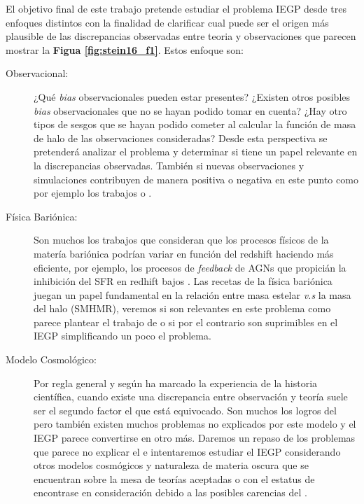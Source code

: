 El objetivo final de este trabajo pretende estudiar el problema IEGP desde tres enfoques distintos con la finalidad de clarificar cual puede ser el origen más plausible de las discrepancias observadas entre teoria y observaciones que parecen mostrar la \textbf{Figua \ref{fig:stein16_f1}}. Estos enfoque son:
\begin{description}
	\item[Observacional:] ¿Qué \textit{bias} observacionales pueden estar presentes? ¿Existen otros posibles \textit{bias} observacionales que no se hayan podido tomar en cuenta? ¿Hay otro tipos de sesgos que se hayan podido cometer al calcular la función de masa de halo de las observaciones consideradas? Desde esta perspectiva se pretenderá analizar el problema y determinar si tiene un papel relevante en la discrepancias observadas. También si nuevas observaciones y simulaciones contribuyen de manera positiva o negativa en este punto como por ejemplo los trabajos \cite{wang2019dominant} o \cite{behroozi2019universemachine}.
	
	\item[Física Bariónica:] Son muchos los trabajos que consideran que los procesos físicos de la matería bariónica podrían variar en función del redshift haciendo más eficiente, por ejemplo, los procesos de \textit{feedback} de AGNs que propicián la inhibición del SFR en redhift bajos \citep{finkelstein2015increasing}. Las recetas de la física bariónica juegan un papel fundamental en la relación entre masa estelar \textit{v.s} la masa del halo (SMHMR), veremos si son relevantes en este problema como parece plantear el trabajo de \cite{finkelstein2015increasing} o si por el contrario son suprimibles en el IEGP simplificando un poco el problema.
	
	\item[Modelo Cosmológico:] Por regla general y según ha marcado la experiencia de la historia científica, cuando existe una discrepancia entre observación y teoría suele ser el segundo factor el que está equivocado. Son muchos los logros del \lcdm pero también existen muchos problemas no explicados por este modelo y el IEGP parece convertirse en otro más. Daremos un repaso de los problemas que parece no explicar el \lcdm e intentaremos estudiar el IEGP considerando otros modelos cosmógicos y naturaleza de materia oscura que se encuentran sobre la mesa de teorías aceptadas o con el estatus de encontrase en consideración debido a las posibles carencias del \lcdm.
\end{description}


